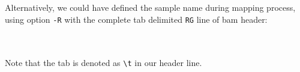 Alternatively, we could have defined the sample name during mapping process,
using option \texttt{-R} with the complete tab delimited \texttt{RG} line of bam header:\\~\\
\\

\begin{framed}
Note that the tab is denoted as \texttt{\textbackslash t} in our header line.
\end{framed}

\\

